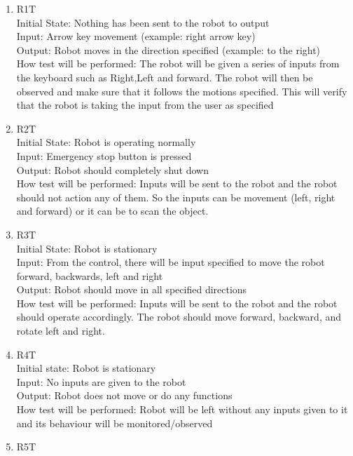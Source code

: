 \documentclass[12pt, titlepage]{article}
\begin{document}
\begin{enumerate}


\item{R1T\\}
Initial State: Nothing has been sent to the robot to output \\
Input: Arrow key movement (example: right arrow key) \\ 
Output: Robot moves in the direction specified (example: to the right) \\ 
How test will be performed: The robot will be given a series of inputs from the keyboard such as Right,Left and forward. The robot will then be observed and make sure that it follows the motions specified. This will verify that the robot is taking the input from the user as specified \\
\item{R2T\\}
Initial State: Robot is operating normally \\ 
Input: Emergency stop button is pressed \\ 
Output: Robot should completely shut down \\
How test will be performed: Inputs will be sent to the robot and the robot should not action any of them. So the inputs can be movement (left, right and forward) or it can be to scan the object.  \\
\item{R3T\\}
Initial State: Robot is stationary \\
Input: From the control, there will be input specified to move the robot forward, backwards, left and right \\
Output: Robot should move in all specified directions \\
How test will be performed: Inputs will be sent to the robot and the robot should operate accordingly. The robot should move forward, backward, and rotate left and right. \\
\item{R4T\\}
Initial state: Robot is stationary \\
Input: No inputs are given to the robot \\
Output: Robot does not move or do any functions \\
How test will be performed: Robot will be left without any inputs given to it and its behaviour will be monitored/observed \\
\item{R5T\\}

\end{enumerate}
\end{document}
